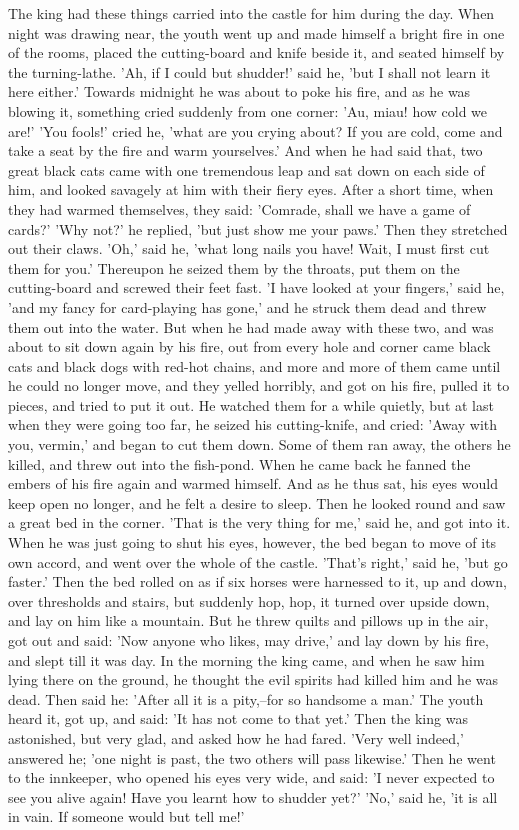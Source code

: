 \documentclass[12pt]{book}
\begin{document}
The king had these things carried into the castle for him during the
day. When night was drawing near, the youth went up and made himself a
bright fire in one of the rooms, placed the cutting-board and knife
beside it, and seated himself by the turning-lathe. 'Ah, if I could
but shudder!' said he, 'but I shall not learn it here either.' Towards
midnight he was about to poke his fire, and as he was blowing it,
something cried suddenly from one corner: 'Au, miau! how cold we are!'
'You fools!' cried he, 'what are you crying about? If you are cold,
come and take a seat by the fire and warm yourselves.' And when he had
said that, two great black cats came with one tremendous leap and sat
down on each side of him, and looked savagely at him with their fiery
eyes. After a short time, when they had warmed themselves, they said:
'Comrade, shall we have a game of cards?' 'Why not?' he replied, 'but
just show me your paws.' Then they stretched out their claws. 'Oh,'
said he, 'what long nails you have! Wait, I must first cut them for
you.' Thereupon he seized them by the throats, put them on the
cutting-board and screwed their feet fast. 'I have looked at your
fingers,' said he, 'and my fancy for card-playing has gone,' and he
struck them dead and threw them out into the water. But when he had
made away with these two, and was about to sit down again by his fire,
out from every hole and corner came black cats and black dogs with
red-hot chains, and more and more of them came until he could no
longer move, and they yelled horribly, and got on his fire, pulled it
to pieces, and tried to put it out. He watched them for a while
quietly, but at last when they were going too far, he seized his
cutting-knife, and cried: 'Away with you, vermin,' and began to cut
them down. Some of them ran away, the others he killed, and threw out
into the fish-pond. When he came back he fanned the embers of his fire
again and warmed himself. And as he thus sat, his eyes would keep open
no longer, and he felt a desire to sleep. Then he looked round and saw
a great bed in the corner. 'That is the very thing for me,' said he,
and got into it. When he was just going to shut his eyes, however, the
bed began to move of its own accord, and went over the whole of the
castle. 'That's right,' said he, 'but go faster.' Then the bed rolled
on as if six horses were harnessed to it, up and down, over thresholds
and stairs, but suddenly hop, hop, it turned over upside down, and lay
on him like a mountain. But he threw quilts and pillows up in the air,
got out and said: 'Now anyone who likes, may drive,' and lay down by
his fire, and slept till it was day. In the morning the king came, and
when he saw him lying there on the ground, he thought the evil spirits
had killed him and he was dead. Then said he: 'After all it is a
pity,--for so handsome a man.' The youth heard it, got up, and said:
'It has not come to that yet.' Then the king was astonished, but very
glad, and asked how he had fared. 'Very well indeed,' answered he;
'one night is past, the two others will pass likewise.' Then he went
to the innkeeper, who opened his eyes very wide, and said: 'I never
expected to see you alive again! Have you learnt how to shudder yet?'
'No,' said he, 'it is all in vain. If someone would but tell me!'
\end{document}
